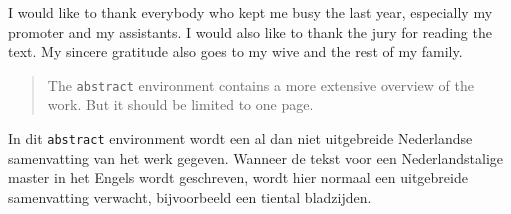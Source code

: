 \documentclass[master=cws,masteroption=gs,english]{kulemt/kulemt}
\begin{document}

\begin{preface}
  I would like to thank everybody who kept me busy the last year,
  especially my promoter and my assistants. I would also like to thank the
  jury for reading the text. My sincere gratitude also goes to my wive and
  the rest of my family.
\end{preface}

\tableofcontents*

\begin{abstract}
  The \texttt{abstract} environment contains a more extensive overview of
  the work. But it should be limited to one page.

  \lipsum[1]
\end{abstract}

\begin{abstract*}
  In dit \texttt{abstract} environment wordt een al dan niet uitgebreide
  Nederlandse samenvatting van het werk gegeven.
  Wanneer de tekst voor een Nederlandstalige master in het Engels wordt
  geschreven, wordt hier normaal een uitgebreide samenvatting verwacht,
  bijvoorbeeld een tiental bladzijden. 
  
  \lipsum[1]
\end{abstract*}

\listoffigures
\end{document}

